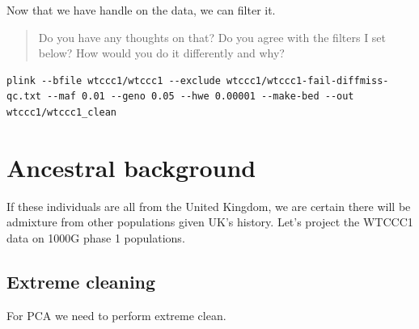 \documentclass[
]{book}
\begin{document}
Now that we have handle on the data, we can filter it.

\begin{quote}
Do you have any thoughts on that? Do you agree with the filters I set below? How would you do it differently and why?
\end{quote}

\begin{verbatim}
plink --bfile wtccc1/wtccc1 --exclude wtccc1/wtccc1-fail-diffmiss-qc.txt --maf 0.01 --geno 0.05 --hwe 0.00001 --make-bed --out wtccc1/wtccc1_clean
\end{verbatim}

\hypertarget{ancestral-background-1}{%
\section{Ancestral background}\label{ancestral-background-1}}

If these individuals are all from the United Kingdom, we are certain there will be admixture from other populations given UK's history. Let's project the WTCCC1 data on 1000G phase 1 populations.

\hypertarget{extreme-cleaning}{%
\subsection{Extreme cleaning}\label{extreme-cleaning}}

For PCA we need to perform extreme clean.
\end{document}
